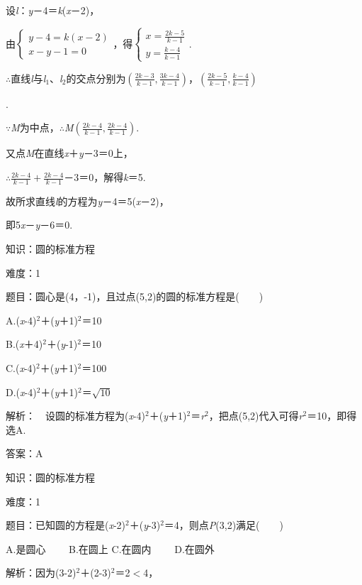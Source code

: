 \documentclass{article} %
\begin{document}
设\textit{l}：\textit{y}－4＝\textit{k}(\textit{x}－2)，

由$\left\{\begin{array}{l} y-4=k(x-2)\\ x-y-1=0 \end{array}\right.$，得$\left\{\begin{array}{l} x=\frac{2k-5}{k-1}\\ y=\frac{k-4}{k-1} \end{array}\right.$.

$\mathrm{\therefore}$直线\textit{l}与\textit{l}${}_{1}$、\textit{l}${}_{2}$的交点分别为$(\frac{2k-3}{k-1}, \frac{3k-4}{k-1})$，$(\frac{2k-5}{k-1}, \frac{k-4}{k-1})$

.

$\mathrm{\because}$\textit{M}为中点，$\mathrm{\therefore}$\textit{M}$(\frac{2k-4}{k-1}, \frac{2k-4}{k-1})$.

又点\textit{M}在直线\textit{x}＋\textit{y}－3＝0上，

$\mathrm{\therefore}\frac{2k-4}{k-1}+\frac{2k-4}{k-1}$－3＝0，解得\textit{k}＝5.

故所求直线\textit{l}的方程为\textit{y}－4＝5(\textit{x}－2)，

即5\textit{x}－\textit{y}－6＝0.





知识：圆的标准方程

难度：1

题目：圆心是(4，-1)，且过点(5,2)的圆的标准方程是(　　)

A.(\textit{x}-4)${}^{2}$＋(\textit{y}＋1)${}^{2}$＝10

B.(\textit{x}＋4)${}^{2}$＋(\textit{y}-1)${}^{2}$＝10

C.(\textit{x}-4)${}^{2}$＋(\textit{y}＋1)${}^{2}$＝100

D.(\textit{x}-4)${}^{2}$＋(\textit{y}＋1)${}^{2}$＝$\sqrt{10}$

解析：　设圆的标准方程为(\textit{x}-4)${}^{2}$＋(\textit{y}＋1)${}^{2}$＝\textit{r}${}^{2}$，把点(5,2)代入可得\textit{r}${}^{2}$＝10，即得选A.

答案：A

知识：圆的标准方程

难度：1

题目：已知圆的方程是(\textit{x}-2)${}^{2}$＋(\textit{y}-3)${}^{2}$＝4，则点\textit{P}(3,2)满足(　　)

A.是圆心　　 B.在圆上 C.在圆内　　 D.在圆外

解析：因为(3-2)${}^{2}$＋(2-3)${}^{2}$＝2$\mathrm{<}$4，
\end{document}
